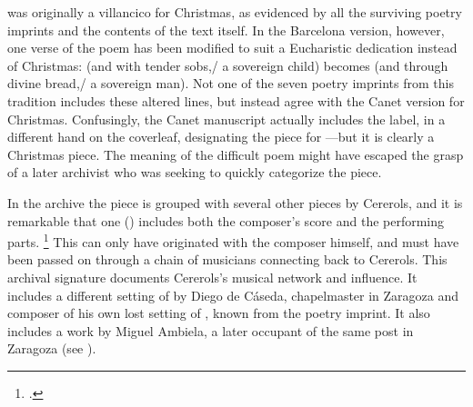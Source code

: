 
 was originally a villancico for Christmas, as
evidenced by all the surviving poetry imprints and the contents of the text
itself.
In the Barcelona version, however, one verse of the poem has been modified to
suit a Eucharistic dedication instead of Christmas:  (and with tender sobs,/ a sovereign child) becomes
 (and through divine bread,/
a sovereign man).
Not one of the seven poetry imprints from this tradition includes these altered
lines, but instead agree with the Canet version for Christmas.
Confusingly, the Canet manuscript actually includes the label, in a different
hand on the coverleaf, designating the piece for ---but it is clearly a Christmas piece.
The meaning of the difficult poem might have escaped the grasp of a later
archivist who was seeking to quickly categorize the piece.


In the archive the piece is grouped with several other pieces by Cererols, and
it is remarkable that one () includes both
the composer's score and the performing parts.%
    \footnote{.}
This can only have originated with the composer himself, and must have been
passed on through a chain of musicians connecting back to Cererols.
This archival signature documents Cererols's musical network and influence.
It includes a different setting of  by Diego
de Cáseda, chapelmaster in Zaragoza and composer of his own lost setting of
, known from the poetry imprint.
It also includes a work by Miguel Ambiela, a later occupant of the same post in
Zaragoza (see ).


